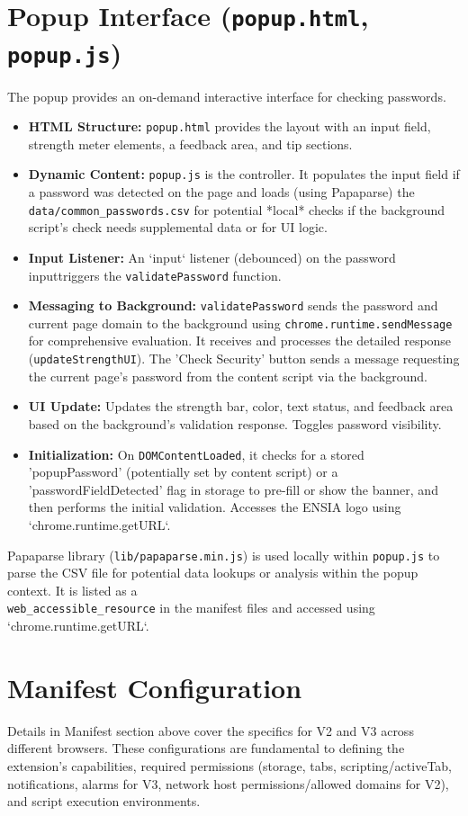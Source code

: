 \documentclass[11pt,oneside,a4paper]{book}
\begin{document}
\section{Popup Interface (\texttt{popup.html}, \texttt{popup.js})}
The popup provides an on-demand interactive interface for checking passwords.
\begin{itemize}
    \item \textbf{HTML Structure:} \texttt{popup.html} provides the layout with an input field, strength meter elements, a feedback area, and tip sections.
    \item \textbf{Dynamic Content:} \texttt{popup.js} is the controller. It populates the input field if a password was detected on the page and loads (using Papaparse) the \texttt{data/common\_passwords.csv} for potential *local* checks if the background script's check needs supplemental data or for UI logic.
    \item \textbf{Input Listener:} An `input` listener (debounced) on the password inputtriggers the \texttt{validatePassword} function.
    \item \textbf{Messaging to Background:} \texttt{validatePassword} sends the password and current page domain to the background using \texttt{chrome.runtime.sendMessage} for comprehensive evaluation. It receives and processes the detailed response (\texttt{updateStrengthUI}). The 'Check Security' button sends a message requesting the current page's password from the content script via the background.
    \item \textbf{UI Update:} Updates the strength bar, color, text status, and feedback area based on the background's validation response. Toggles password visibility.
    \item \textbf{Initialization:} On \texttt{DOMContentLoaded}, it checks for a stored 'popupPassword' (potentially set by content script) or a 'passwordFieldDetected' flag in storage to pre-fill or show the banner, and then performs the initial validation. Accesses the ENSIA logo using `chrome.runtime.getURL`.
\end{itemize}
Papaparse library (\texttt{lib/papaparse.min.js}) is used locally within \texttt{popup.js} to parse the CSV file for potential data lookups or analysis within the popup context. It is listed as a\\ \texttt{web\_accessible\_resource} in the manifest files and accessed using `chrome.runtime.getURL`.

\section{Manifest Configuration}
Details in Manifest section above cover the specifics for V2 and V3 across different browsers. These configurations are fundamental to defining the extension's capabilities, required permissions (storage, tabs, scripting/activeTab, notifications, alarms for V3, network host permissions/allowed domains for V2), and script execution environments.
\end{document}
